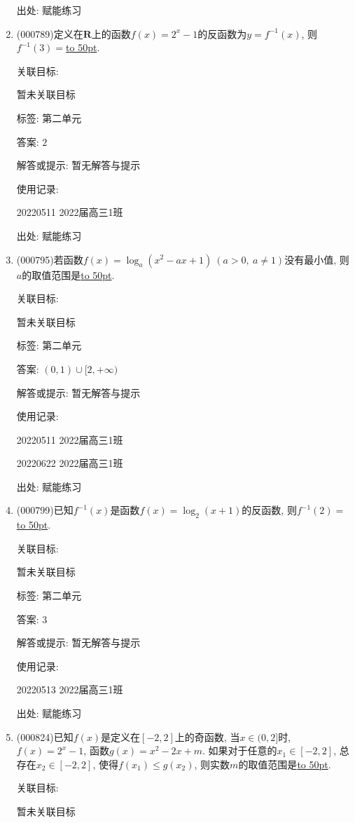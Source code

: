 \documentclass[10pt,a4paper]{article}
\newcommand{\blank}[1]{\underline{\hbox to #1pt{}}}
\begin{document}
\begin{enumerate}[1.]
出处: 赋能练习
\item { (000789)}定义在$\mathbf{R}$上的函数$f(x)=2^x-1$的反函数为$y=f^{-1}(x)$, 则$f^{-1}(3)=$\blank{50}.


关联目标:

暂未关联目标



标签: 第二单元

答案: $2$

解答或提示: 暂无解答与提示

使用记录:

20220511	2022届高三1班	


出处: 赋能练习
\item { (000795)}若函数$f(x)={\log_a}(x^2-ax+1)\ (a>0, \ a\ne 1)$没有最小值, 则$a$的取值范围是\blank{50}.


关联目标:

暂未关联目标



标签: 第二单元

答案: $(0,1)\cup [2,+\infty)$

解答或提示: 暂无解答与提示

使用记录:

20220511	2022届高三1班	

20220622	2022届高三1班  	


出处: 赋能练习
\item { (000799)}已知$f^{-1}(x)$是函数$f(x)=\log_2(x+1)$的反函数, 则$f^{-1}(2)=$\blank{50}.


关联目标:

暂未关联目标



标签: 第二单元

答案: $3$

解答或提示: 暂无解答与提示

使用记录:

20220513	2022届高三1班	


出处: 赋能练习
\item { (000824)}已知$f(x)$是定义在$[-2,2]$上的奇函数, 当$x\in (0,2]$时,$f(x)=2^x-1$, 函数$g(x)=x^2-2x+m$. 如果对于任意的$x_1\in [-2,2]$, 总存在$x_2\in [-2,2]$, 使得$f(x_1)\le g(x_2)$, 则实数$m$的取值范围是\blank{50}.


关联目标:

暂未关联目标




\end{enumerate}
\end{document}

